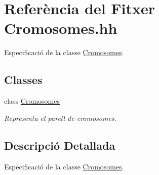 \hypertarget{_cromosomes_8hh}{}\section{Referència del Fitxer Cromosomes.\+hh}
\label{_cromosomes_8hh}


Especificació de la classe \hyperlink{class_cromosomes}{Cromosomes}.  


\subsection*{Classes}
\begin{DoxyCompactItemize}
\item 
class \hyperlink{class_cromosomes}{Cromosomes}
\begin{DoxyCompactList}\small\item\em Representa el parell de cromosomes. \end{DoxyCompactList}\end{DoxyCompactItemize}


\subsection{Descripció Detallada}
Especificació de la classe \hyperlink{class_cromosomes}{Cromosomes}. 

